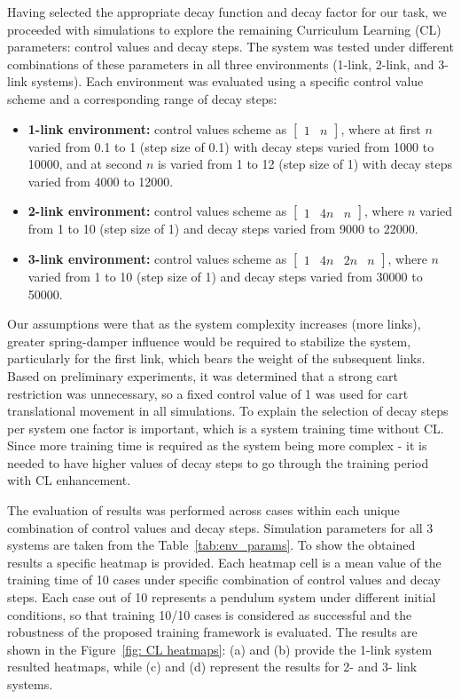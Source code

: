Having selected the appropriate decay function and decay factor for our task, we proceeded with simulations to explore the remaining Curriculum Learning (CL) parameters: control values and decay steps. The system was tested under different combinations of these parameters in all three environments (1-link, 2-link, and 3-link systems).
Each environment was evaluated using a specific control value scheme and a corresponding range of decay steps:
\begin{itemize}
	\item \textbf{1-link environment:} control values scheme as \(\begin{bmatrix} 1 & n \end{bmatrix}\), where at first $n$ varied from 0.1 to 1 (step size of 0.1) with decay steps varied from 1000 to 10000, and at second $n$ is varied from 1 to 12 (step size of 1) with decay steps varied from 4000 to 12000.
	\item \textbf{2-link environment:} control values scheme as \(\begin{bmatrix} 1 & 4n & n \end{bmatrix}\), where $n$ varied from 1 to 10 (step size of 1) and decay steps varied from 9000 to 22000.
	\item \textbf{3-link environment:} control values scheme as \(\begin{bmatrix} 1 & 4n & 2n & n \end{bmatrix}\), where $n$ varied from 1 to 10 (step size of 1) and decay steps varied from 30000 to 50000.
\end{itemize}

Our assumptions were that as the system complexity increases (more links), greater spring-damper influence would be required to stabilize the system, particularly for the first link, which bears the weight of the subsequent links. Based on preliminary experiments, it was determined that a strong cart restriction was unnecessary, so a fixed control value of 1 was used for cart translational movement in all simulations. To explain the selection of decay steps per system one factor is important, which is a system training time without CL. Since more training time is required as the system being more complex - it is needed to have higher values of decay steps to go through the training period with CL enhancement.

The evaluation of results was performed across cases within each unique combination of control values and decay steps. Simulation parameters for all 3 systems are taken from the Table~\ref{tab:env_params}. To show the obtained results a specific heatmap is provided. Each heatmap cell is a mean value of the training time of 10 cases under specific combination of control values and decay steps. Each case out of 10 represents a pendulum system under different initial conditions, so that training 10/10 cases is considered as successful and the robustness of the proposed training framework is evaluated. The results are shown in the Figure~\ref{fig: CL heatmaps}: (a) and (b) provide the 1-link system resulted heatmaps, while (c) and (d) represent the results for 2- and 3- link systems.


